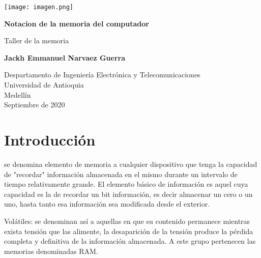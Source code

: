 \documentclass{article}
\begin{document}
\begin{titlepage}
\renewcommand{\headrulewidth}{3pt}
\fancyhead[L]{}
\fancyhead[R]{}
    \texttt{[image: imagen.png]}
    \begin{center}
        \vspace*{1cm} 
            
        \Huge
        \textbf{Notacion de la memoria del computador}
            
        \vspace{0.8 cm
}
        
        \LARGE
        Taller de la memoria 
            
        \vspace{1.5cm}
            
        \textbf{Jackh Emmanuel Narvaez Guerra}
            
        \vfill
            
        \vspace{0.8cm}
            
        \Large
        Despartamento de Ingeniería Electrónica y Telecomunicaciones\\
        Universidad de Antioquia\\
        Medellín\\
        Septiembre de 2020
            
    \end{center}
\end{titlepage}
\thispagestyle{fancy}

\newpage
\tableofcontents


\newpage

\section{Introducción}


se denomina elemento de memoria a cualquier dispositivo que tenga la capacidad de "recordar" información almacenada en el mismo durante un intervalo de tiempo relativamente grande. El elemento básico de información es aquel cuya capacidad es la de recordar un bit información, es decir almacenar un cero o un uno, hasta tanto esa información sea modificada desde el exterior.

Volátiles: se denominan así a aquellas en que su contenido permanece mientras exista tensión que las alimente, la desaparición de la tensión produce la pérdida completa y definitiva de la información almacenada. A este grupo pertenecen las memorias denominadas RAM.
\end{document}
